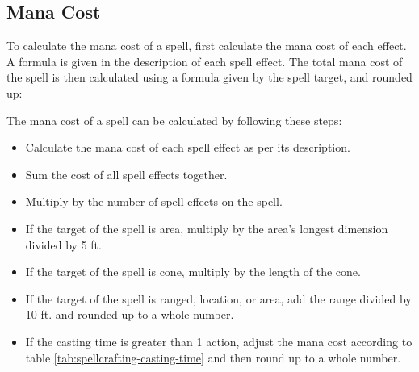     \subsection{Mana Cost}
    To calculate the mana cost of a spell, first calculate the mana cost of
    each effect. A formula is given in the description of each spell effect.
    The total mana cost of the spell is then calculated using a formula given
    by the spell target, and rounded up:

    The mana cost of a spell can be calculated by following these steps:
    \begin{itemize}
        \item Calculate the mana cost of each spell effect as per its
            description.
        \item Sum the cost of all spell effects together.
        \item Multiply by the number of spell effects on the spell.
        \item If the target of the spell is area, multiply by the area's
            longest dimension divided by 5 ft.
        \item If the target of the spell is cone, multiply by the length of
            the cone.
        \item If the target of the spell is ranged, location, or area,
            add the range divided by 10 ft. and rounded up to a
            whole number.
        \item If the casting time is greater than 1 action, adjust the mana
            cost according to table \ref{tab:spellcrafting-casting-time} and
            then round up to a whole number.
    \end{itemize}
